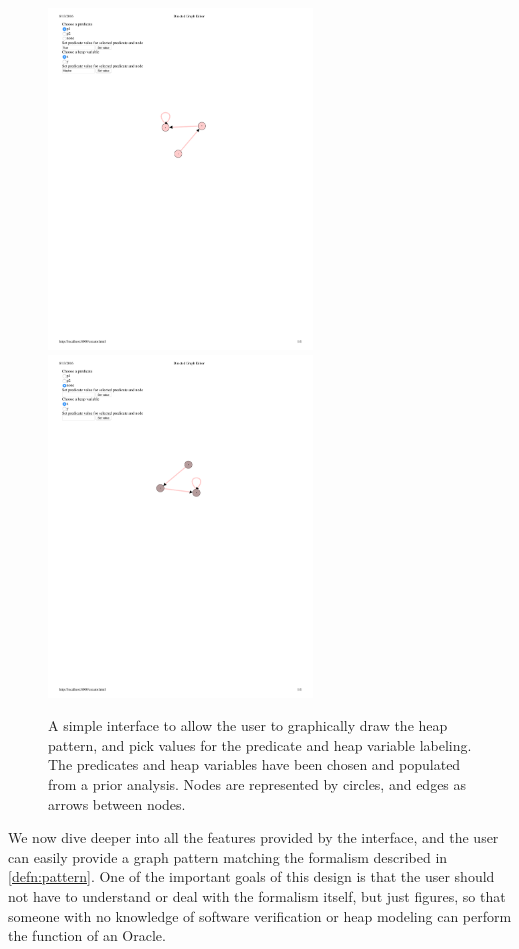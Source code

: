 \begin{figure}
  \centering
  \includegraphics[width=7cm]{fig/predicate-heapvar-val.pdf}
  \includegraphics[width=7cm]{fig/basic-graph.pdf}
  \caption{A simple interface to allow the user to graphically draw the heap pattern, and pick values for the predicate and heap variable labeling. The predicates and heap variables have been chosen and populated from a prior analysis. Nodes are represented by circles, and edges as arrows between nodes.
  }
  \label{fig:basic-graph-interface}
\end{figure}

We now dive deeper into all the features provided by the interface, and the user can easily provide a graph pattern matching the formalism described in \autoref{defn:pattern}. One of the important goals of this design is that the user should not have to understand or deal with the formalism itself, but just figures, so that someone with no knowledge of software verification or heap modeling can perform the function of an Oracle.

